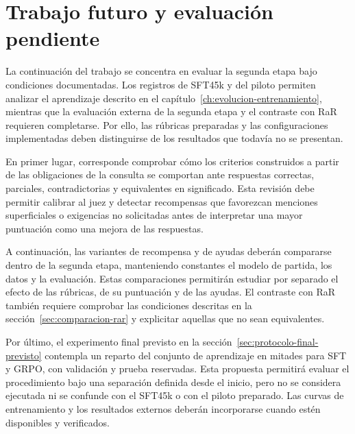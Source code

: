 \section{Trabajo futuro y evaluación pendiente}
\label{sec:trabajo-futuro}
La continuación del trabajo se concentra en evaluar la segunda etapa bajo condiciones documentadas. Los registros de SFT45k y del piloto permiten analizar el aprendizaje descrito en el capítulo~\ref{ch:evolucion-entrenamiento}, mientras que la evaluación externa de la segunda etapa y el contraste con RaR requieren completarse. Por ello, las rúbricas preparadas y las configuraciones implementadas deben distinguirse de los resultados que todavía no se presentan.

En primer lugar, corresponde comprobar cómo los criterios construidos a partir de las obligaciones de la consulta se comportan ante respuestas correctas, parciales, contradictorias y equivalentes en significado. Esta revisión debe permitir calibrar al juez y detectar recompensas que favorezcan menciones superficiales o exigencias no solicitadas antes de interpretar una mayor puntuación como una mejora de las respuestas.

A continuación, las variantes de recompensa y de ayudas deberán compararse dentro de la segunda etapa, manteniendo constantes el modelo de partida, los datos y la evaluación. Estas comparaciones permitirán estudiar por separado el efecto de las rúbricas, de su puntuación y de las ayudas. El contraste con RaR también requiere comprobar las condiciones descritas en la sección~\ref{sec:comparacion-rar} y explicitar aquellas que no sean equivalentes.

Por último, el experimento final previsto en la sección~\ref{sec:protocolo-final-previsto} contempla un reparto del conjunto de aprendizaje en mitades para SFT y GRPO, con validación y prueba reservadas. Esta propuesta permitirá evaluar el procedimiento bajo una separación definida desde el inicio, pero no se considera ejecutada ni se confunde con el SFT45k o con el piloto preparado. Las curvas de entrenamiento y los resultados externos deberán incorporarse cuando estén disponibles y verificados.
